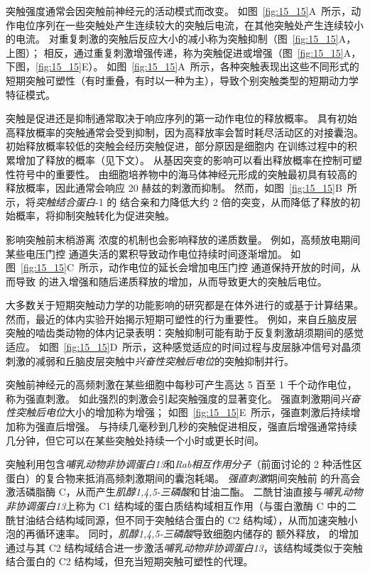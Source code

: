 突触强度通常会因突触前神经元的活动模式而改变。
如图~\ref{fig:15_15}A~所示，动作电位序列在一些突触处产生连续较大的突触后电流，在其他突触处产生连续较小的电流。
对重复刺激的突触后反应大小的减小称为突触抑制（图~\ref{fig:15_15}A，上图）；
相反，通过重复刺激增强传递，称为突触促进或增强（图~\ref{fig:15_15}A，下图，\ref{fig:15_15}E）。
如图~\ref{fig:15_15}A~所示，各种突触表现出这些不同形式的短期突触可塑性（有时重叠，有时以一种为主），导致个别突触类型的短期动力学特征模式。


突触是促进还是抑制通常取决于响应序列的第一动作电位的释放概率。
具有初始高释放概率的突触通常会受到抑制，因为高释放率会暂时耗尽活动区的对接囊泡。
初始释放概率较低的突触会经历突触促进，部分原因是细胞内  在训练过程中的积累增加了释放的概率（见下文）。
从基因突变的影响可以看出释放概率在控制可塑性符号中的重要性。
由细胞培养物中的海马体神经元形成的突触最初具有较高的释放概率，因此通常会响应 20 赫兹的刺激而抑制。
然而，如图~\ref{fig:15_15}B~所示，将\textit{突触结合蛋白}-1 的  结合亲和力降低大约 2 倍的突变，从而降低了释放的初始概率，将抑制突触转化为促进突触。


影响突触前末梢游离  浓度的机制也会影响释放的递质数量。
例如，高频放电期间某些电压门控  通道失活的累积导致动作电位持续时间逐渐增加。
如图~\ref{fig:15_15}C~所示，动作电位的延长会增加电压门控  通道保持开放的时间，从而导致  的进入增强和随后递质释放的增加，从而导致更大的突触后电位。


大多数关于短期突触动力学的功能影响的研究都是在体外进行的或基于计算结果。
然而，最近的体内实验开始揭示短期可塑性的行为重要性。
例如，来自丘脑皮层突触的啮齿类动物的体内记录表明：突触抑制可能有助于反复刺激胡须期间的感觉适应。
如图~\ref{fig:15_15}D~所示，这种感觉适应的时间过程与皮层脉冲信号对晶须刺激的减弱和丘脑皮层突触中\textit{兴奋性突触后电位}的突触抑制并行。


突触前神经元的高频刺激在某些细胞中每秒可产生高达 5 百至 1 千个动作电位，称为强直刺激。
如此强烈的刺激会引起突触强度的显著变化。
强直刺激期间\textit{兴奋性突触后电位}大小的增加称为增强；
如图~\ref{fig:15_15}E~所示，强直刺激后持续增加称为强直后增强。
与持续几毫秒到几秒的突触促进相反，强直后增强通常持续几分钟，但它可以在某些突触处持续一个小时或更长时间。


突触利用包含\textit{哺乳动物非协调蛋白13}和\textit{Rab相互作用分子}（前面讨论的 2 种活性区蛋白）的复合物来抵消高频刺激期间的囊泡耗竭。
\textit{强直刺激}期间突触前  的升高会激活磷脂酶 C，从而产生\textit{肌醇1,4,5-三磷酸}和甘油二酯。
二酰甘油直接与\textit{哺乳动物非协调蛋白13}上称为 C1 结构域的蛋白质结构域相互作用（与蛋白激酶 C 中的二酰甘油结合结构域同源，但不同于突触结合蛋白的 C2 结构域），从而加速突触小泡的再循环速率。
同时，\textit{肌醇1,4,5-三磷酸}导致细胞内储存的  额外释放， 的增加通过与其 C2 结构域结合进一步激活\textit{哺乳动物非协调蛋白13}，该结构域类似于突触结合蛋白的 C2 结构域，但充当短期突触可塑性的代理。



